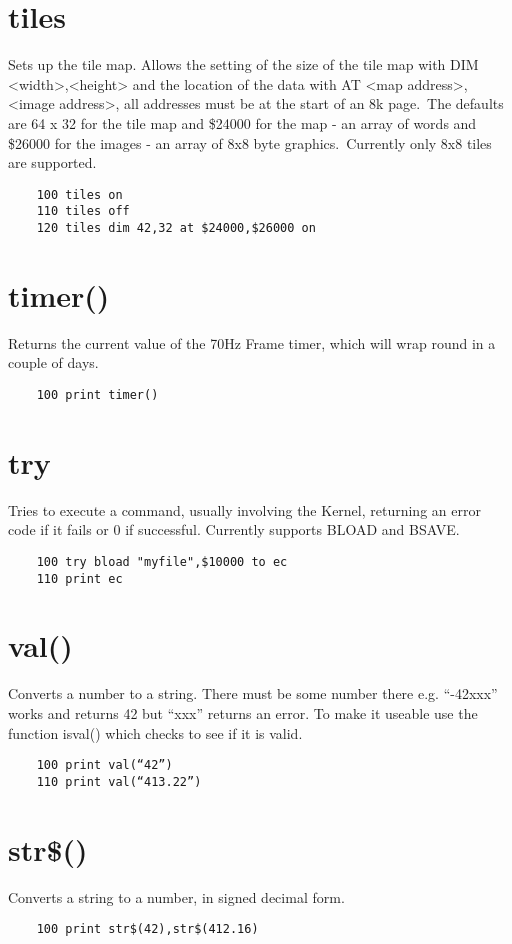 \section*{tiles}
Sets up the tile map. Allows the setting of the size of the tile map with DIM <width>,<height> and the location of the data with AT <map address>,<image address>, all addresses must be at the start of an 8k page.\
The defaults are 64 x 32 for the tile map and \$24000 for the map - an array of words and \$26000 for the images - an array of 8x8 byte graphics.\
Currently only 8x8 tiles are supported. 
\example{}
\begin{verbatim}
	100 tiles on
	110 tiles off
	120 tiles dim 42,32 at $24000,$26000 on
\end{verbatim}

\section*{timer()}
Returns the current value of the 70Hz Frame timer, which will wrap round in a couple of days.
\example{}
\begin{verbatim}
	100 print timer()
\end{verbatim}

\section*{try}
Tries to execute a command, usually involving the Kernel, returning an error code if it fails or 0 if successful. Currently supports BLOAD and BSAVE.
\example{}
\begin{verbatim}
	100 try bload "myfile",$10000 to ec
	110 print ec
\end{verbatim}

\section*{val()}
Converts a number to a string. There must be some number there e.g. “-42xxx” works and returns 42 but “xxx” returns an error.  To make it useable use the function isval() which checks to see if it is valid.
\example{}
\begin{verbatim}
	100 print val(“42”)
	110 print val(“413.22”)
\end{verbatim}

\section*{str\$()}
Converts a string to a number, in signed decimal form. 
\example{}
\begin{verbatim}
	100 print str$(42),str$(412.16)
\end{verbatim}

